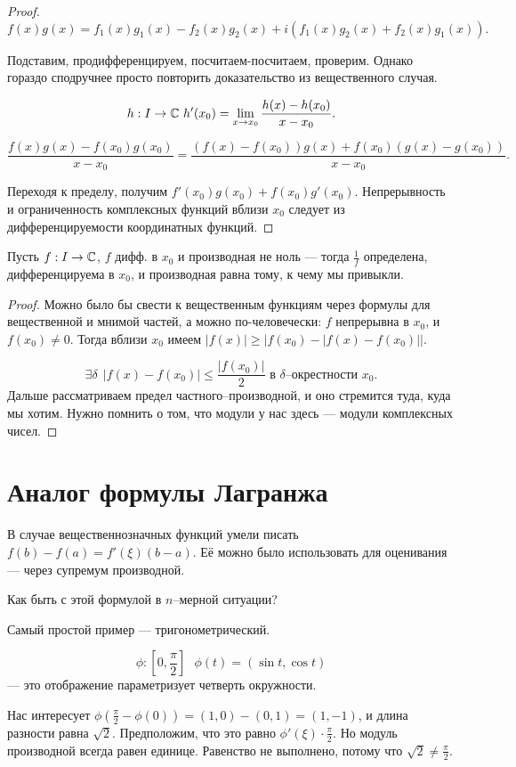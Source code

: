 \documentclass[12pt]{report}
\begin{document}
\begin{proof}
$$f(x)g(x) = f_1(x)g_1(x) - f_2(x)g_2(x) + i(f_1(x)g_2(x)+f_2(x)g_1(x)).$$

Подставим, продифференцируем, посчитаем-посчитаем, проверим. Однако гораздо сподручнее просто повторить доказательство из вещественного случая.

$$h: I \to \mathbb{C} \ h'(x_0) = \lim_{x \to x_0}{\frac{h(x)-h(x_0)}{x-x_0}}.$$

$$\frac{f(x)g(x)-f(x_0)g(x_0)}{x-x_0} =
  \frac{(f(x)-f(x_0))g(x) + f(x_0)(g(x)-g(x_0))}{x-x_0}.$$

Переходя к пределу, получим $f'(x_0)g(x_0) + f(x_0)g'(x_0)$. Непрерывность и ограниченность комплексных функций вблизи $x_0$ следует из дифференцируемости координатных функций.

\end{proof}

\begin{lm}
Пусть $f: I \to \mathbb{C}$, $f$ дифф. в $x_0$ и производная не ноль --- тогда $\frac{1}{f}$ определена, дифференцируема в $x_0$, и производная равна тому, к чему мы привыкли.
\end{lm}
\begin{proof}
Можно было бы свести к вещественным функциям через формулы для вещественной и мнимой частей, а можно по-человечески: $f$ непрерывна в $x_0$, и $f(x_0) \ne 0$. Тогда вблизи $x_0$ имеем $|f(x)| \ge |f(x_0) - |f(x)-f(x_0)||$.

$$\exists \delta \ \ |f(x)-f(x_0)| \le \frac{|f(x_0)|}{2} \mbox{\ \ в $\delta$--окрестности $x_0$.}$$
Дальше рассматриваем предел частного--производной, и оно стремится туда, куда мы хотим. Нужно помнить о том, что модули у нас здесь --- модули комплексных чисел.
\end{proof}

\section{Аналог формулы Лагранжа}

\begin{rem}
В случае вещественнозначных функций умели писать $f(b)-f(a) = f'(\xi)(b-a)$. Её можно было использовать для оценивания --- через супремум производной.

Как быть с этой формулой в $n$--мерной ситуации?
\end{rem}

\begin{ex}

Самый простой пример --- тригонометрический. 

$$\phi:[0,\frac{\pi}{2}]\ \ \ \phi(t) = (\sin t, \cos t)$$
--- это отображение параметризует четверть окружности.

Нас интересует $\phi(\frac{\pi}{2} - \phi(0)) = (1,0)-(0,1) = (1,-1)$, и длина разности равна $\sqrt{2}$. Предположим, что это равно $\phi'(\xi) \cdot \frac{\pi}{2}$. Но модуль производной всегда равен единице. Равенство не выполнено, потому что $\sqrt{2} \ne \frac{\pi}{2}$.
\end{ex}
\end{document}
